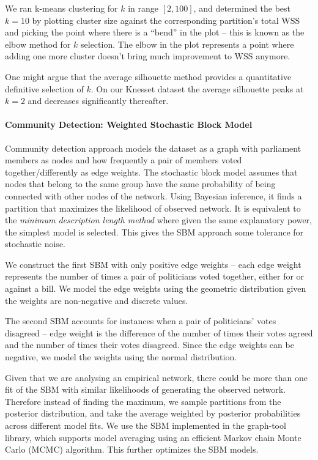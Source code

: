 \documentclass[letterpaper]{article} %
\theoremstyle{definition}
\begin{document}
We ran k-means clustering for $k$ in range $[2, 100]$, and determined the best $k=10$ by plotting cluster size against the corresponding partition's total WSS and picking the point where there is a ``bend'' in the plot – this is known as the elbow method for $k$ selection. The elbow in the plot represents a point where adding one more cluster doesn't bring much improvement to WSS anymore.

One might argue that the average silhouette method provides a quantitative definitive selection of $k$. On our Knesset dataset the average silhouette peaks at $k=2$ and decreases significantly thereafter.

\paragraph{Community Detection: Weighted Stochastic Block Model}
Community detection approach models the dataset as a graph with parliament members as nodes and how frequently a pair of members voted together/differently as edge weights. The stochastic block model assumes that nodes that belong to the same group have the same probability of being connected with other nodes of the network. Using Bayesian inference, it finds a partition that maximizes the likelihood of observed network. It is equivalent to the {\it minimum description length method} where given the same explanatory power, the simplest model is selected. This gives the SBM approach some tolerance for stochastic noise.

We construct the first SBM with only positive edge weights – each edge weight represents the number of times a pair of politicians voted together, either for or against a bill. We model the edge weights using the geometric distribution given the weights are non-negative and discrete values.

The second SBM accounts for instances when a pair of politicians' votes disagreed – edge weight is the difference of the number of times their votes agreed and the number of times their votes disagreed. Since the edge weights can be negative, we model the weights using the normal distribution.

Given that we are analysing an empirical network, there could be more than one fit of the SBM with similar likelihoods of generating the observed network. Therefore instead of finding the maximum, we sample partitions from the posterior distribution, and take the average weighted by posterior probabilities across different model fits. We use the SBM implemented in the graph-tool library, which supports model averaging using an efficient Markov chain Monte Carlo (MCMC) algorithm. This further optimizes the SBM models.
\end{document}

